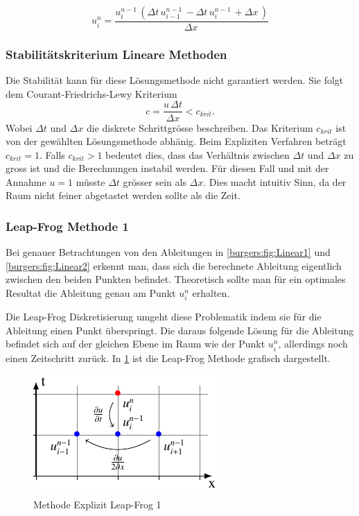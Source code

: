 	\begin{equation}
		u_{i}^{n} = \frac{u^{n-1}_{i}\, \left(\Delta{t}\, u^{n-1}_{i-1}\, - \Delta{t}\, u^{n-1}_{i}\, + \Delta{x}\,\right)}{\Delta{x}\,}
    	\label{burgers:eq_ex_sol_lin2}
	\end{equation}
	
\subsubsection{Stabilit\"atskriterium Lineare Methoden}
	Die Stabilit\"at kann f\"ur diese L\"osungsmethode nicht garantiert werden.
	Sie folgt dem Courant-Friedrichs-Lewy Kriterium
	\begin{equation}
		  c = \frac{u \, \Delta t}{\Delta x} < c_{krit}.
	\end{equation}
	Wobei $ \Delta t$ und $\Delta x$ die diskrete Schrittgr\"osse beschreiben.
	Das Kriterium $c_{krit}$ ist von der gew\"ahlten L\"osungsmethode abh\"anig.
	Beim Expliziten Verfahren beträgt $c_{krit} = 1$.
	Falls $c_{krit} > 1$ bedeutet dies, dass das Verh\"altnis zwischen $ \Delta t$ und $\Delta x$ zu gross ist und die Berechnungen instabil werden.
	F\"ur diesen Fall und mit der Annahme $u = 1$ m\"usste $ \Delta t$ gr\"osser sein als $\Delta x$.
	Dies macht intuitiv Sinn, da der Raum nicht feiner abgetastet werden sollte als die Zeit.
	
	
	
\subsubsection{Leap-Frog Methode 1}
	
	Bei genauer Betrachtungen von den Ableitungen in \ref{burgers:fig:Linear1} und \ref{burgers:fig:Linear2} erkennt man, dass sich die berechnete Ableitung eigentlich zwischen den beiden Punkten befindet.
	Theoretisch sollte man für ein optimales Resultat die Ableitung genau am Punkt $u_{i}^{n}$ erhalten.
	
	\medskip
	Die Leap-Frog Diskretisierung umgeht diese Problematik indem sie f\"ur die Ableitung einen Punkt \"uberspringt.
	Die daraus folgende L\"osung für die Ableitung befindet sich auf der gleichen Ebene im Raum wie der Punkt $u_{i}^{n}$, allerdings noch einen Zeitschritt zurück.
	In \ref{burgers:fig:Linear4} ist die Leap-Frog Methode grafisch dargestellt.
	
	     \begin{figure}
		\centering
		\includegraphics[height=.4\textwidth]{papers/burgers/BurgersEquation/tikz/Linear4/Linear4.pdf}
		\caption{Methode Explizit  Leap-Frog 1}
		\label{burgers:fig:Linear4}
		\end{figure}

